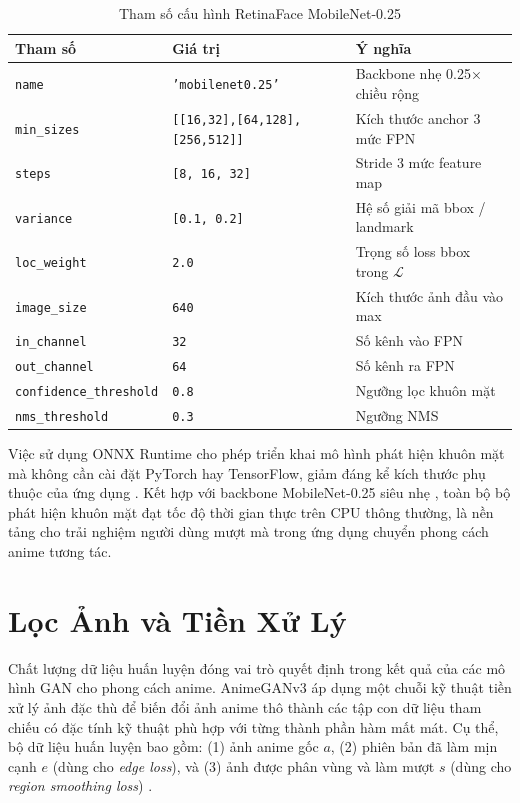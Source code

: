 \begin{table}[H]
\caption{Tham số cấu hình RetinaFace MobileNet-0.25}
\label{tab:retinaface_config}
\centering
\begin{tabular}{|l|l|l|}
\hline
\textbf{Tham số} & \textbf{Giá trị} & \textbf{Ý nghĩa} \\
\hline
\texttt{name} & \texttt{'mobilenet0.25'} & Backbone nhẹ 0.25× chiều rộng \\
\hline
\texttt{min\_sizes} & \texttt{[[16,32],[64,128],[256,512]]} & Kích thước anchor 3 mức FPN \\
\hline
\texttt{steps} & \texttt{[8, 16, 32]} & Stride 3 mức feature map \\
\hline
\texttt{variance} & \texttt{[0.1, 0.2]} & Hệ số giải mã bbox / landmark \\
\hline
\texttt{loc\_weight} & \texttt{2.0} & Trọng số loss bbox trong $\mathcal{L}$ \\
\hline
\texttt{image\_size} & \texttt{640} & Kích thước ảnh đầu vào max \\
\hline
\texttt{in\_channel} & \texttt{32} & Số kênh vào FPN \\
\hline
\texttt{out\_channel} & \texttt{64} & Số kênh ra FPN \\
\hline
\texttt{confidence\_threshold} & \texttt{0.8} & Ngưỡng lọc khuôn mặt \\
\hline
\texttt{nms\_threshold} & \texttt{0.3} & Ngưỡng NMS \\
\hline
\end{tabular}
\end{table}

Việc sử dụng ONNX Runtime cho phép triển khai mô hình phát hiện khuôn mặt
mà không cần cài đặt PyTorch hay TensorFlow, giảm đáng kể kích thước phụ thuộc của ứng dụng
\cite{ONNX2019}. Kết hợp với backbone MobileNet-0.25 siêu nhẹ \cite{Howard2017MobileNet},
toàn bộ bộ phát hiện khuôn mặt đạt tốc độ thời gian thực trên CPU thông thường, là nền tảng
cho trải nghiệm người dùng mượt mà trong ứng dụng chuyển phong cách anime tương tác.


\section{Lọc Ảnh và Tiền Xử Lý}
\label{sec:image_preprocessing}

Chất lượng dữ liệu huấn luyện đóng vai trò quyết định trong kết quả của các mô hình GAN
cho phong cách anime. AnimeGANv3 áp dụng một chuỗi kỹ thuật tiền xử lý ảnh đặc thù để
biến đổi ảnh anime thô thành các tập con dữ liệu tham chiếu có đặc tính kỹ thuật phù hợp
với từng thành phần hàm mất mát. Cụ thể, bộ dữ liệu huấn luyện bao gồm: (1) ảnh anime gốc
$a$, (2) phiên bản đã làm mịn cạnh $e$ (dùng cho \textit{edge loss}), và (3) ảnh được
phân vùng và làm mượt $s$ (dùng cho \textit{region smoothing loss}) \cite{Liu2024}.

